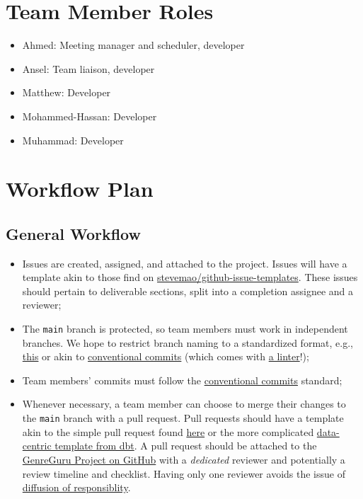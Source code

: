 \documentclass{article}
\begin{document}
\section{Team Member Roles}
\begin{itemize}
  \item Ahmed: Meeting manager and scheduler, developer
  \item Ansel: Team liaison, developer
  \item Matthew: Developer
  \item Mohammed-Hassan: Developer
  \item Muhammad: Developer
\end{itemize}

\section{Workflow Plan}
\subsection{General Workflow}
\begin{itemize}
  \item Issues are created, assigned, and attached to the project. Issues will have a template akin to those find on \href{https://github.com/stevemao/github-issue-templates/tree/master/system/ISSUE_TEMPLATE}{stevemao/github-issue-templates}. These issues should pertain to deliverable sections, split into a completion assignee and a reviewer;
  \item The \texttt{main} branch is protected, so team members must work in independent branches. We hope to restrict branch naming to a standardized format, e.g., \href{https://dev.to/varbsan/a-simplified-convention-for-naming-branches-and-commits-in-git-il4}{this} or akin to \href{https://www.conventionalcommits.org/en/v1.0.0/}{conventional commits} (which comes with \href{https://github.com/conventional-changelog/commitlint/tree/master/%40commitlint/config-conventional}{a linter}!);
  \item Team members' commits must follow the \href{https://www.conventionalcommits.org/en/v1.0.0/}{conventional commits} standard;
  \item Whenever necessary, a team member can choose to merge their changes to the \texttt{main} branch with a pull request. Pull requests should have a template akin to the simple pull request found \href{https://graphite.dev/guides/pull-request-templates}{here} or the more complicated \href{https://github.com/dbt-labs/dbt-init/blob/master/starter-project/.github/pull_request_template.md}{data-centric template from dbt}. A pull request should be attached to the \href{https://github.com/users/AhmedAl-Hayali/projects/1}{GenreGuru Project on GitHub} with a \emph{dedicated} reviewer and potentially a review timeline and checklist. Having only one reviewer avoids the issue of \href{https://en.wikipedia.org/wiki/Diffusion_of_responsibility}{diffusion of responsiblity}.
\end{itemize}
\end{document}
